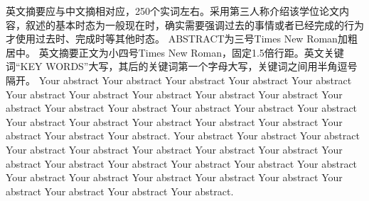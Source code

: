 \xiaosi

英文摘要应与中文摘相对应，250个实词左右。采用第三人称介绍该学位论文内容，叙述的基本时态为一般现在时，确实需要强调过去的事情或者已经完成的行为才使用过去时、完成时等其他时态。
ABSTRACT为三号Times New Roman加粗居中。
英文摘要正文为小四号Times New Roman，固定1.5倍行距。英文关键词“KEY WORDS”大写，其后的关键词第一个字母大写，关键词之间用半角逗号隔开。
Your abstract Your abstract Your abstract Your abstract Your abstract Your abstract Your abstract Your abstract Your abstract Your abstract Your abstract Your abstract Your abstract Your abstract Your abstract Your abstract Your abstract Your abstract Your abstract Your abstract Your abstract Your abstract Your abstract Your abstract. Your abstract Your abstract Your abstract Your abstract Your abstract Your abstract Your abstract Your abstract Your abstract Your abstract Your abstract Your abstract Your abstract Your abstract Your abstract Your abstract Your abstract Your abstract Your abstract Your abstract Your abstract Your abstract Your abstract.

